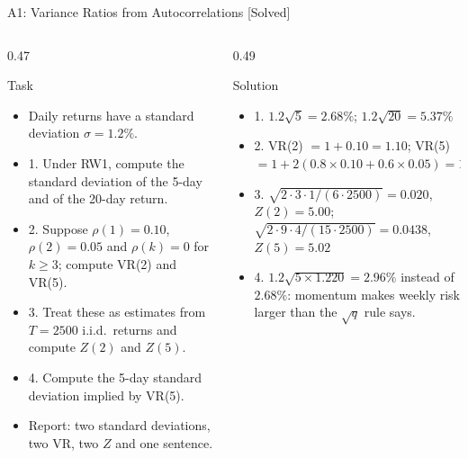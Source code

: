 \begin{frame}{A1: Variance Ratios from Autocorrelations [Solved]}
\itemsize{\scriptsize}
\begin{columns}[T]
\begin{column}{0.47\textwidth}
\begin{block}{Task}
\begin{itemize}
    \item Daily returns have a standard deviation $\sigma = 1.2\%$.
    \item 1. Under RW1, compute the standard deviation of the 5-day and of the 20-day return.
    \item 2. Suppose $\rho(1) = 0.10$, $\rho(2) = 0.05$ and $\rho(k) = 0$ for $k \ge 3$; compute VR(2) and VR(5).
    \item 3. Treat these as estimates from $T = 2500$ i.i.d.\ returns and compute $Z(2)$ and $Z(5)$.
    \item 4. Compute the 5-day standard deviation implied by VR(5).
    \item Report: two standard deviations, two VR, two $Z$ and one sentence.
\end{itemize}
\end{block}
\end{column}
\begin{column}{0.49\textwidth}
\begin{exampleblock}{Solution}
\begin{itemize}
    \item 1. $1.2\sqrt5 = 2.68\%$; $1.2\sqrt{20} = 5.37\%$
    \item 2. VR(2) $= 1 + 0.10 = 1.10$; VR(5) $= 1 + 2(0.8 \times 0.10 + 0.6 \times 0.05) = 1.220$
    \item 3. $\sqrt{2 \cdot 3 \cdot 1/(6 \cdot 2500)} = 0.020$, $Z(2) = 5.00$; $\sqrt{2 \cdot 9 \cdot 4/(15 \cdot 2500)} = 0.0438$, $Z(5) = 5.02$
    \item 4. $1.2\sqrt{5 \times 1.220} = 2.96\%$ instead of $2.68\%$: momentum makes weekly risk larger than the $\sqrt{q}$ rule says.
\end{itemize}
\end{exampleblock}
\end{column}
\end{columns}
\end{frame}

